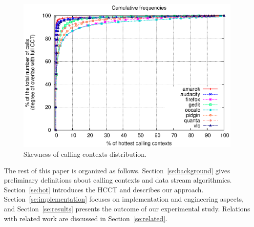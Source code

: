 \documentclass[preprint]{sigplanconf}
\begin{document}
\begin{figure}[t]
\includegraphics[width=\columnwidth]{charts/cumulative.eps}
\caption{Skewness of calling contexts distribution.}
\label{fig:skewness}
\end{figure}

\noindent The rest of this paper is organized as follows. Section~\ref{se:background} gives preliminary definitions about calling contexts and data stream algorithmics. Section~\ref{se:hot}  introduces the HCCT and describes our approach. Section~\ref{se:implementation} focuses on implementation and engineering aspects, and Section~\ref{se:results} presents the outcome of our experimental study. Relations with related work are discussed in Section~\ref{se:related}.
\end{document}
